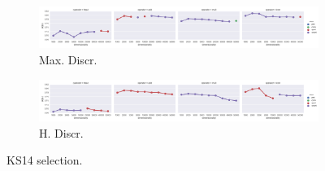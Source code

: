 \begin{landscape}
\begin{figure}
  \begin{subfigure}[t]{0.7\textwidth}
    \includegraphics[width=\textwidth]{supplement/figures/KS14-max_-selection-discr}
    \caption{Max. Discr.}
    \label{fig:}
  \end{subfigure}
  \begin{subfigure}[t]{0.7\textwidth}
    \includegraphics[width=\textwidth]{supplement/figures/KS14-heuristics-selection-discr}
    \caption{H. Discr.}
    \label{fig:}
  \end{subfigure}

  \caption{KS14 selection.}
  \label{fig:selection_ks14}
\end{figure}

\end{landscape}

\restoregeometry

